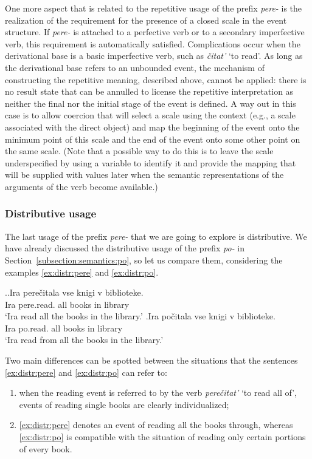 One more aspect that is related to the repetitive usage of the prefix \textit{pere-} is the realization of the requirement for the presence of a closed scale in the event structure. If \textit{pere-} is attached to a perfective verb or to a secondary imperfective verb, this requirement is automatically satisfied. Complications occur when the derivational base is a basic imperfective verb, such as \textit{\v{c}itat'} `to read'. As long as the derivational base refers to an unbounded event, the mechanism of constructing the repetitive meaning, described above, cannot be applied: there is no result state that can be annulled to license the repetitive interpretation as neither the final nor the initial stage of the event is defined. A way out in this case is to allow coercion that will select a scale using the context (e.g., a scale associated with the direct object) and map the beginning of the event onto the minimum point of this scale and the end of the event onto some other point on the same scale. (Note that a possible way to do this is to leave the scale underspecified by using a variable to identify it and provide the mapping that will be supplied with values later when the semantic representations of the arguments of the verb become available.)

\subsubsection{Distributive usage}
The last usage of the prefix \textit{pere-} that we are going to explore is distributive. We have already discussed the distributive usage of the prefix \textit{po-} in Section~\ref{subsection:semantics:po}, so let us compare them, considering the examples \ref{ex:distr:pere} and \ref{ex:distr:po}.

\ex.\ag.\label{ex:distr:pere}Ira pere\v{c}itala vse knigi v biblioteke.\\
Ira pere.read. all books in library\\
\vspace{0.5em}
`Ira read all the books in the library.'
\bg.\label{ex:distr:po}Ira po\v{c}itala vse knigi v biblioteke.\\
Ira po.read. all books in library\\
\vspace{0.5em}
`Ira read from all the books in the library.'

Two main differences can be spotted between the situations that the sentences \ref{ex:distr:pere} and \ref{ex:distr:po} can refer to:
\begin{enumerate}
\item when the reading event is referred to by the verb \textit{pere\v{c}itat'} `to read all of', events of reading single books are clearly individualized;
\item \ref{ex:distr:pere} denotes an event of reading all the books through, whereas \ref{ex:distr:po} is compatible with the situation of reading only certain portions of every book.
\end{enumerate}

